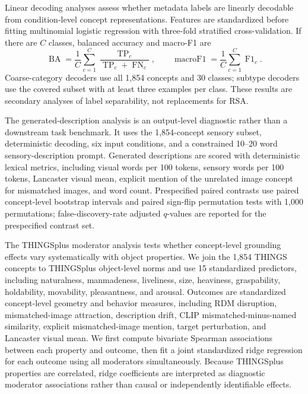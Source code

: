 \documentclass{article}
\begin{document}
Linear decoding analyses assess whether metadata labels are linearly decodable from condition-level concept representations. Features are standardized before fitting multinomial logistic regression with three-fold stratified cross-validation. If there are \(C\) classes, balanced accuracy and macro-F1 are
\begin{equation}
  \operatorname{BA}=\frac{1}{C}\sum_{c=1}^{C}
  \frac{\operatorname{TP}_c}{\operatorname{TP}_c+\operatorname{FN}_c},
  \qquad
  \operatorname{macroF1}=\frac{1}{C}\sum_{c=1}^{C}\operatorname{F1}_c.
  \label{eq:appendix_probe_metrics}
\end{equation}
Coarse-category decoders use all 1,854 concepts and 30 classes; subtype decoders use the covered subset with at least three examples per class. These results are secondary analyses of label separability, not replacements for RSA.

The generated-description analysis is an output-level diagnostic rather than a downstream task benchmark. It uses the 1,854-concept sensory subset, deterministic decoding, six input conditions, and a constrained 10--20 word sensory-description prompt. Generated descriptions are scored with deterministic lexical metrics, including visual words per 100 tokens, sensory words per 100 tokens, Lancaster visual mean, explicit mention of the unrelated image concept for mismatched images, and word count. Prespecified paired contrasts use paired concept-level bootstrap intervals and paired sign-flip permutation tests with 1,000 permutations; false-discovery-rate adjusted \(q\)-values are reported for the prespecified contrast set.

The THINGSplus moderator analysis tests whether concept-level grounding effects vary systematically with object properties. We join the 1,854 THINGS concepts to THINGSplus object-level norms and use 15 standardized predictors, including naturalness, manmadeness, liveliness, size, heaviness, graspability, holdability, movability, pleasantness, and arousal. Outcomes are standardized concept-level geometry and behavior measures, including RDM disruption, mismatched-image attraction, description drift, CLIP mismatched-minus-named similarity, explicit mismatched-image mention, target perturbation, and Lancaster visual mean. We first compute bivariate Spearman associations between each property and outcome, then fit a joint standardized ridge regression for each outcome using all moderators simultaneously. Because THINGSplus properties are correlated, ridge coefficients are interpreted as diagnostic moderator associations rather than causal or independently identifiable effects.
\end{document}
